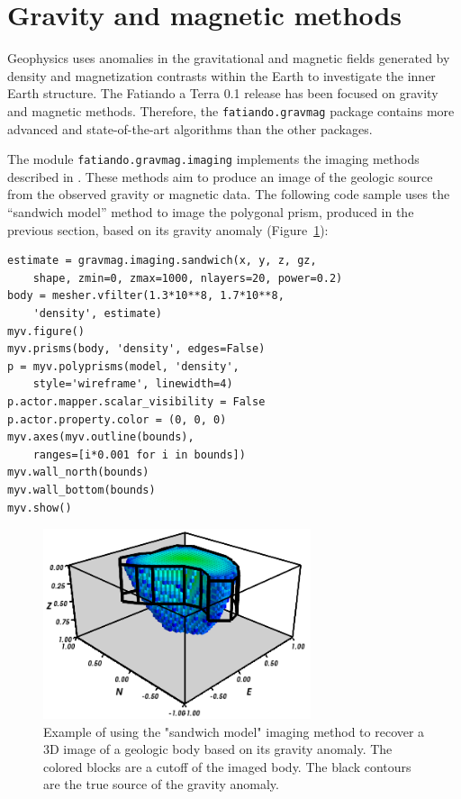 \section{Gravity and magnetic methods}

Geophysics uses anomalies in the gravitational and magnetic fields
generated by density and magnetization contrasts within the Earth to
investigate the inner Earth structure. The Fatiando a Terra 0.1 release
has been focused on gravity and magnetic methods. Therefore, the
\texttt{fatiando.gravmag} package contains more advanced and
state-of-the-art algorithms than the other packages.

The module \texttt{fatiando.gravmag.imaging} implements the imaging methods
described in \citet{fedi2012}. These methods aim to produce an image of the
geologic source from the observed gravity or magnetic data. The following code
sample uses the ``sandwich model'' method \citep{pedersen1991} to image the
polygonal prism, produced in the previous section, based on its gravity anomaly
(Figure~\ref{fig:imaging}):

\begin{verbatim}
estimate = gravmag.imaging.sandwich(x, y, z, gz,
    shape, zmin=0, zmax=1000, nlayers=20, power=0.2)
body = mesher.vfilter(1.3*10**8, 1.7*10**8,
    'density', estimate)
myv.figure()
myv.prisms(body, 'density', edges=False)
p = myv.polyprisms(model, 'density',
    style='wireframe', linewidth=4)
p.actor.mapper.scalar_visibility = False
p.actor.property.color = (0, 0, 0)
myv.axes(myv.outline(bounds),
    ranges=[i*0.001 for i in bounds])
myv.wall_north(bounds)
myv.wall_bottom(bounds)
myv.show()
\end{verbatim}

\begin{figure}
    \centering
    \includegraphics[width=0.7\textwidth]{figures/paper1/gravmag_imaging}
    \caption{
        Example of using the "sandwich model" imaging method to recover a 3D
        image of a geologic body based on its gravity anomaly. The colored
        blocks are a cutoff of the imaged body. The black contours are the true
        source of the gravity anomaly.
    }
    \label{fig:imaging}
\end{figure}

